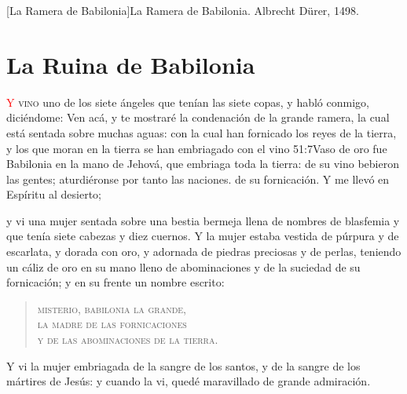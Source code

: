 [La Ramera de Babilonia]{La Ramera de Babilonia. Albrecht Dürer, 1498.}

\chapter{La Ruina de Babilonia}
\lettrine[lines=3,slope=-0.5em,loversize=0.1]{\textcolor{red}{Y}}{\hspace{0.5em} vino} uno de los siete ángeles que tenían las siete copas, y habló conmigo, diciéndome: Ven acá, y te mostraré la condenación de la grande ramera, la cual está sentada sobre muchas aguas:%
con la cual han fornicado los reyes de la tierra,%
 y los que moran en la tierra se han embriagado con el vino%
					  {51:7}{Vaso de oro fue Babilonia en la mano de Jehová, que embriaga toda la tierra: de su vino bebieron las gentes; aturdiéronse por tanto las naciones.}
 de su fornicación.%
Y me llevó en Espíritu al desierto; 

y vi una mujer sentada sobre una bestia bermeja llena de nombres de blasfemia y que tenía siete cabezas y diez cuernos. 
Y la mujer estaba vestida de púrpura y de escarlata, y dorada con oro, y adornada de piedras preciosas y de perlas,%
 teniendo un cáliz de oro en su mano lleno de abominaciones y de la suciedad de su fornicación; 
y en su frente un nombre escrito:%
\begin{verse}
\textsc{%
misterio, babilonia la grande,\\ 
la madre de las fornicaciones\\ 
y de las abominaciones de la tierra.%
}
\end{verse}
Y vi la mujer embriagada de la sangre de los santos, y de la sangre de los mártires de Jesús: y cuando la vi, quedé maravillado de grande admiración. 

